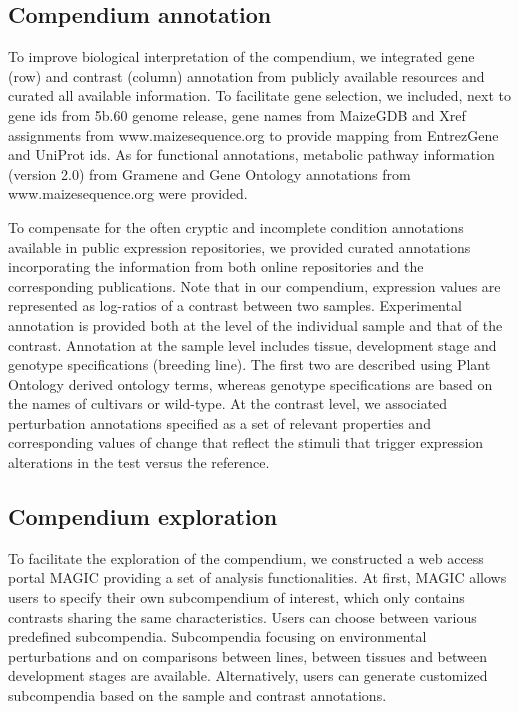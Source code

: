 \subsection{Compendium annotation}\label{sec:magic-anno}

To improve biological interpretation of the compendium, we integrated gene (row) and contrast (column) annotation from publicly available resources and curated all available information. To facilitate gene selection, we included, next to gene ids from 5b.60 genome release, gene names from MaizeGDB \cite{Lawrence2004} and Xref assignments from www.maizesequence.org to provide mapping from EntrezGene and UniProt ids. As for functional annotations, metabolic pathway information (version 2.0) from Gramene \cite{Youens-Clark2010} and Gene Ontology annotations from www.maizesequence.org were provided.

To compensate for the often cryptic and incomplete condition annotations available in public expression repositories, we provided curated annotations incorporating the information from both online repositories and the corresponding publications. Note that in our compendium, expression  values are represented as log-ratios of a contrast between two samples. Experimental annotation is provided both at the level of the individual sample and that of the contrast. Annotation at the sample level includes tissue, development stage and genotype specifications (breeding line). The first two are described using Plant Ontology \cite{Avraham2008} derived ontology terms, whereas genotype specifications  are based on the names of cultivars or wild-type. At the contrast level, we associated perturbation annotations specified as a set of relevant properties and corresponding values of change that reflect the stimuli that trigger expression alterations in the test versus the reference.





\subsection{Compendium exploration}

To facilitate the exploration of the compendium, we constructed a web access portal MAGIC providing a set of analysis functionalities. At first, MAGIC allows users to specify their own subcompendium of interest, which only contains contrasts sharing the same characteristics. Users can choose between various predefined subcompendia. Subcompendia focusing  on environmental perturbations and on comparisons between lines, between tissues and between development stages are available. Alternatively, users can generate customized subcompendia based on the sample and contrast annotations.

